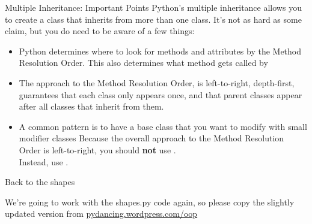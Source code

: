 \documentclass[aspectratio=169] {beamer}
\begin{document}
\begin{frame}[fragile]{Multiple Inheritance: Important Points}
  \small
  Python's multiple inheritance allows you to create a class that inherits from more than one class.
  It's not as hard as some claim, but you do need to be aware of a few things:
  
  \begin{itemize}
    
    
    \item<2-4> Python determines where to look for methods and attributes by the 
    Method Resolution Order.  This also determines what method gets called by

    \item<3-4> The approach to the Method Resolution Order, is left-to-right, depth-first,
    guarantees that each class only appears once, and that parent classes appear after
    all classes that inherit from them.



    \item<4> A common pattern is to have a base class that you want to modify with
    small modifier classes
    Because the overall approach to the Method Resolution Order is left-to-right,
    you should \textbf{not} use 
    . \\[3pt]
    Instead, use 
    .

  \end{itemize}
    
\end{frame}



\begin{frame}{Back to the shapes}
  
  We're going to work with the shapes.py code again,
  so please copy the slightly updated version from
  \url{pydancing.wordpress.com/oop}
  
\end{frame}
\end{document}
